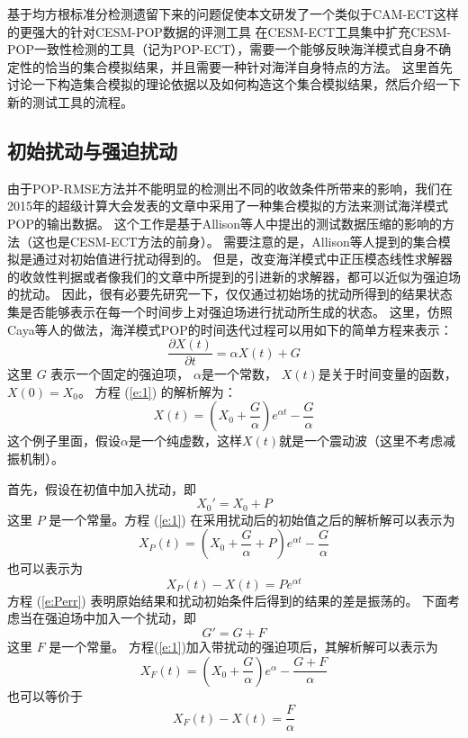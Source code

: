 基于均方根标准分检测遗留下来的问题促使本文研发了一个类似于CAM-ECT这样的更强大的针对CESM-POP数据的评测工具
在CESM-ECT工具集中扩充CESM-POP一致性检测的工具（记为POP-ECT），需要一个能够反映海洋模式自身不确定性的恰当的集合模拟结果，并且需要一种针对海洋自身特点的方法。
这里首先讨论一下构造集合模拟的理论依据以及如何构造这个集合模拟结果，然后介绍一下新的测试工具的流程。 


\subsection{初始扰动与强迫扰动}\label{verify:pertub}

由于POP-RMSE方法并不能明显的检测出不同的收敛条件所带来的影响，我们在2015年的超级计算大会发表的文章中采用了一种集合模拟的方法来测试海洋模式POP的输出数据\cite{yong2015}。 
这个工作是基于Allison等人\cite{baker2014methodology}中提出的测试数据压缩的影响的方法（这也是CESM-ECT方法的前身）。
需要注意的是，Allison等人提到的集合模拟是通过对初始值进行扰动得到的。 
但是，改变海洋模式中正压模态线性求解器的收敛性判据或者像我们的文章\cite{yong2015}中所提到的引进新的求解器，都可以近似为强迫场的扰动。 
因此，很有必要先研究一下，仅仅通过初始场的扰动所得到的结果状态集是否能够表示在每一个时间步上对强迫场进行扰动所生成的状态。
这里，仿照Caya等人\cite{caya1998}的做法，海洋模式POP的时间迭代过程可以用如下的简单方程来表示：
\begin{equation}
\frac{\partial X(t)}{\partial t} = \alpha X(t) +G
\label{e:1}
\end{equation}
这里 $G$ 表示一个固定的强迫项，  $\alpha$是一个常数，  $X(t)$是关于时间变量的函数， $X(0) = X_0$。 
方程 (\ref{e:1}) 的解析解为：
\begin{equation}
X(t) = (X_0 +\frac{G}{\alpha})e^{\alpha t } -\frac{G}{\alpha}
\label{e:2}
\end{equation}
这个例子里面，假设$\alpha$是一个纯虚数，这样$X(t)$就是一个震动波（这里不考虑减振机制）。 

 
首先，假设在初值中加入扰动，即
\begin{equation*}
X_0' =X_0+P
\end{equation*}
这里 $P$ 是一个常量。方程 (\ref{e:1}) 在采用扰动后的初始值之后的解析解可以表示为 
\begin{equation}
X_P(t) = (X_0+\frac{G}{\alpha}+P)e^{\alpha t } -\frac{G}{\alpha}
\label{e:Pan}
\end{equation}
也可以表示为
\begin{equation}
X_P(t)-X(t) = Pe^{\alpha t }
\label{e:Perr}
\end{equation}
方程 (\ref{e:Perr}) 表明原始结果和扰动初始条件后得到的结果的差是振荡的。
下面考虑当在强迫场中加入一个扰动，即
\begin{equation*}
G' = G + F
\end{equation*}
这里 $F$ 是一个常量。  方程(\ref{e:1})加入带扰动的强迫项后，其解析解可以表示为
\begin{equation}
X_F(t) = (X_0 +\frac{G}{\alpha})e^{\alpha } -\frac{G+F}{\alpha}
\label{e:Fan}
\end{equation}
也可以等价于
\begin{equation}
X_F(t)-X(t) = \frac{F}{\alpha} 
\label{e:Ferr}
\end{equation}

